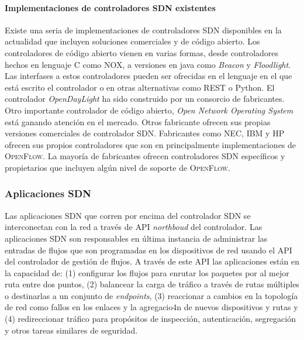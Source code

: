 \documentclass[10pt,journal,compsoc]{IEEEtran}
\begin{document}
\paragraph{Implementaciones de controladores SDN existentes}
Existe una seria de implementaciones de controladores SDN disponibles en la actualidad que incluyen soluciones comerciales y de código abierto. Los controladores de código abierto vienen en varias formas, desde controladores hechos en lenguaje C como NOX, a versiones en java como \emph{Beacon} y \emph{Floodlight}. Las interfases a estos controladores pueden ser ofrecidas en el lenguaje en el que está escrito el controlador o en otras alternativas como REST o Python. El controlador \emph{OpenDayLight} ha sido construido por un consorcio de fabricantes. Otro importante controlador de código abierto, \emph{Open Network Operating System} está ganando atención en el mercado. Otros fabricante ofrecen sus propias versiones comerciales de controlador SDN.  Fabricantes como NEC, IBM y HP ofrecen sus propios controladores que son en principalmente implementaciones de \textsc{OpenFlow}. La mayoría de fabricantes ofrecen controladores SDN específicos y propietarios que incluyen algún nivel de soporte de \textsc{OpenFlow}.

\subsubsection{Aplicaciones SDN}
Las aplicaciones SDN que corren por encima del controlador SDN se interconectan con la red a través de API \emph{northboud} del controlador. Las aplicaciones SDN son responsables en última instancia de administrar las entradas de flujos que son programadas en los dispositivos de red usando el API del controlador de gestión de flujos. A través de este API las aplicaciones están en la capacidad de: (1) configurar los flujos para enrutar los paquetes por al mejor ruta entre dos puntos, (2) balancear la carga de tráfico a través de rutas múltiples o destinarlas a un conjunto de \emph{endpoints}, (3) reaccionar a cambios en la topología de red como fallos en los enlaces y la agregacio4n de nuevos dispositivos y rutas y (4) redireccionar tráfico para propósitos de inspección, autenticación, segregación y otros tareas similares de seguridad.
\end{document}
